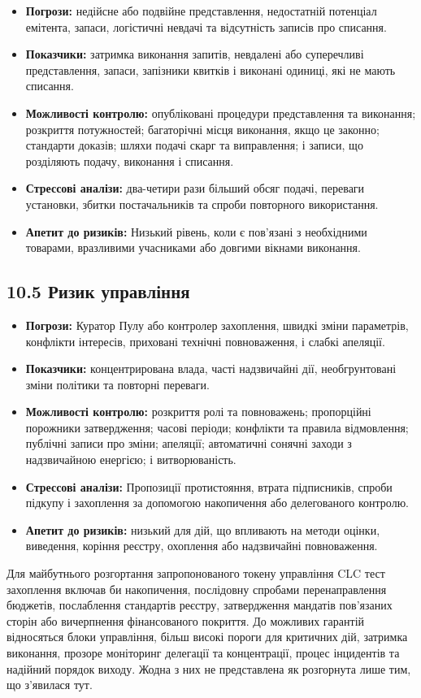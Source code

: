 \documentclass[11pt]{article}
\begin{document}
\begin{itemize}[leftmargin=*]
\item \textbf{Погрози:} недійсне або подвійне представлення, недостатній потенціал емітента, запаси, логістичні невдачі та відсутність записів про списання.
\item \textbf{Показчики:} затримка виконання запитів, невдалені або суперечливі представлення, запаси, запізники квитків і виконані одиниці, які не мають списання.
\item \textbf{Можливості контролю:} опубліковані процедури представлення та виконання; розкриття потужностей; багаторічні місця виконання, якщо це законно; стандарти доказів; шляхи подачі скарг та виправлення; і записи, що розділяють подачу, виконання і списання.
\item \textbf{Стрессові аналізи:} два-четири рази більший обсяг подачі, переваги установки, збитки постачальників та спроби повторного використання.
\item \textbf{Апетит до ризиків:} Низький рівень, коли є пов'язані з необхідними товарами, вразливими учасниками або довгими вікнами виконання.
\end{itemize}
\subsection*{10.5 Ризик управління}

\begin{itemize}[leftmargin=*]
\item \textbf{Погрози:} Куратор Пулу або контролер захоплення, швидкі зміни параметрів, конфлікти інтересів, приховані технічні повноваження, і слабкі апеляції.
\item \textbf{Показчики:} концентрирована влада, часті надзвичайні дії, необгрунтовані зміни політики та повторні переваги.
\item \textbf{Можливості контролю:} розкриття ролі та повноважень; пропорційні порожники затвердження; часові періоди; конфлікти та правила відмовлення; публічні записи про зміни; апеляції; автоматичні сонячні заходи з надзвичайною енергією; і витворюваність.
\item \textbf{Стрессові аналізи:} Пропозиції протистояння, втрата підписників, спроби підкупу і захоплення за допомогою накопичення або делегованого контролю.
\item \textbf{Апетит до ризиків:} низький для дій, що впливають на методи оцінки, виведення, коріння реєстру, охоплення або надзвичайні повноваження.
\end{itemize}
Для майбутнього розгортання запропонованого токену управління CLC тест захоплення включав би накопичення, послідовну спробами перенаправлення бюджетів, послаблення стандартів реєстру, затвердження мандатів пов'язаних сторін або вичерпнення фінансованого покриття. До можливих гарантій відносяться блоки управління, більш високі пороги для критичних дій, затримка виконання, прозоре моніторинг делегації та концентрації, процес інцидентів та надійний порядок виходу. Жодна з них не представлена як розгорнута лише тим, що з'явилася тут.
\end{document}

